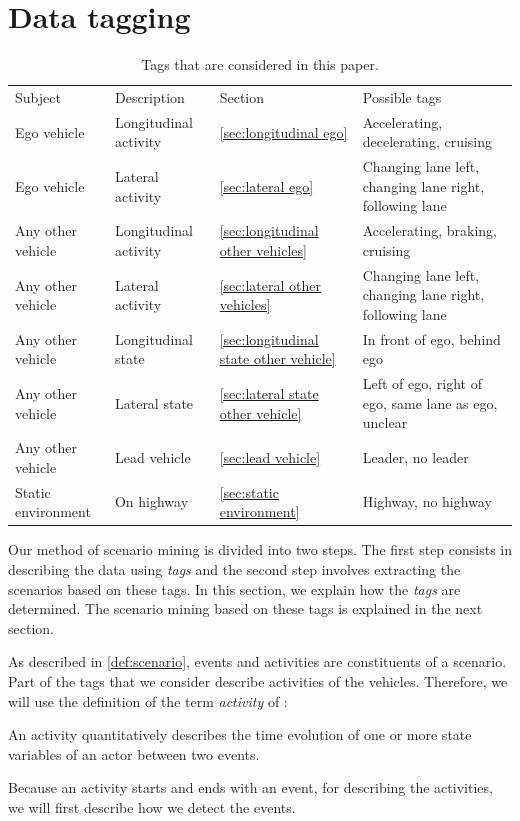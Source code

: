 \section{Data tagging}
\label{sec:tagging}

\begin{table}
	\cstarta
	\centering
	\caption{\cstarta Tags that are considered in this paper.\cenda}
	\label{tab:tags}
	\begin{tabular}{llll}
		\toprule
		Subject & Description & Section & Possible tags \\ \otoprule
		Ego vehicle & Longitudinal activity & \cref{sec:longitudinal ego} & Accelerating, decelerating, cruising \\
		Ego vehicle & Lateral activity & \cref{sec:lateral ego} & Changing lane left, changing lane right, following lane \\
		Any other vehicle & Longitudinal activity & \cref{sec:longitudinal other vehicles} & Accelerating, braking, cruising \\
		Any other vehicle & Lateral activity & \cref{sec:lateral other vehicles} & Changing lane left, changing lane right, following lane \\
		Any other vehicle & Longitudinal state & \cref{sec:longitudinal state other vehicle} & In front of ego, behind ego \\
		Any other vehicle & Lateral state & \cref{sec:lateral state other vehicle} & Left of ego, right of ego, same lane as ego, unclear \\
		Any other vehicle & Lead vehicle & \cref{sec:lead vehicle} & Leader, no leader \\
		Static environment & On highway & \cref{sec:static environment} & Highway, no highway \\ 
		\bottomrule
	\end{tabular}
	\cenda
\end{table}

\cstarta
Our method of scenario mining is divided into two steps. 
The first step consists in describing the data using \emph{tags} and the second step involves extracting the scenarios based on these tags. 
In this section, we explain how the \emph{tags} are determined. 
The scenario mining based on these tags is explained in the next section.

As described in \cref{def:scenario}, events and activities are constituents of a scenario. 
Part of the tags that we consider describe activities of the vehicles.
Therefore, we will use the definition of the term \emph{activity} of \autocite{degelder2018ontology}:\cenda
\begin{definition}
	\label{def:activity}
	An activity quantitatively describes the time evolution of one or more state variables of an actor between two events.
\end{definition}
Because an activity starts and ends with an event, for describing the activities, we will first describe how we detect the events.

